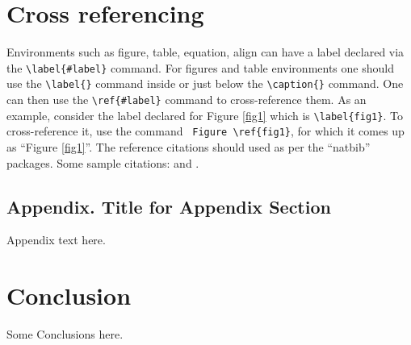 \documentclass[autowc]{CUP-JNL-PPS}
\begin{document}
\section{Cross referencing}

Environments such as figure, table, equation, align can have a label
declared via the \verb+\label{#label}+ command. For figures and table
environments one should use the \verb+\label{}+ command inside or just
below the \verb+\caption{}+ command.  One can then use the
\verb+\ref{#label}+ command to cross-reference them. As an example, consider
the label declared for Figure \ref{fig1} which is
\verb+\label{fig1}+. To cross-reference it, use the command
\verb+ Figure \ref{fig1}+, for which it comes up as
``Figure \ref{fig1}''.
The reference citations should used as per the ``natbib'' packages. Some sample citations:  \cite{bib1} and \citep{bib1,bib2,bib3,bib4,bib5}.

\begin{appendix}\appheader
\section{Appendix. Title for Appendix Section}\label{appendixA}
Appendix text here.
\end{appendix}

\theendnotes

\section{Conclusion}

Some Conclusions here.
\end{document}
